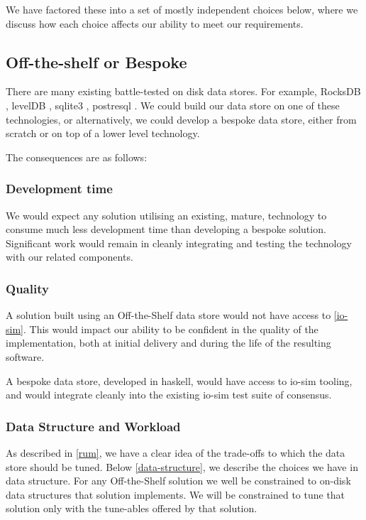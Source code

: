 \documentclass[11pt,a4paper]{article}
\begin{document}
We have factored these into a set of mostly independent choices below, where we
discuss how each choice affects our ability to meet our requirements.

\subsection{Off-the-shelf or Bespoke}

There are many existing battle-tested on disk data stores. For example, RocksDB
, levelDB , sqlite3 , postresql . We
could build our data store on one of these technologies, or alternatively, we
could develop a bespoke data store, either from scratch or on top of a lower
level technology.

The consequences are as follows:

\subsubsection{Development time}
We would expect any solution utilising an existing, mature, technology to
consume much less development time than developing a bespoke solution.
Significant work would remain in cleanly integrating and testing the technology
with our related components.

\subsubsection{Quality}
A solution built using an Off-the-Shelf data store would not have access to
\ref{io-sim}.  This would impact our ability to be confident in the quality of
the implementation, both at initial delivery and during the life of the
resulting software.


A bespoke data store, developed in haskell, would have access to io-sim tooling,
and would integrate cleanly into the existing io-sim test suite of consensus.


\subsubsection{Data Structure and Workload}
As described in \ref{rum}, we have a clear idea of the trade-offs to which the
data store should be tuned. Below \ref{data-structure}, we describe the choices we
have in data structure. For any Off-the-Shelf solution we well be constrained to
on-disk data structures that solution implements. We will be constrained to tune
that solution only with the tune-ables offered by that solution.
\end{document}
